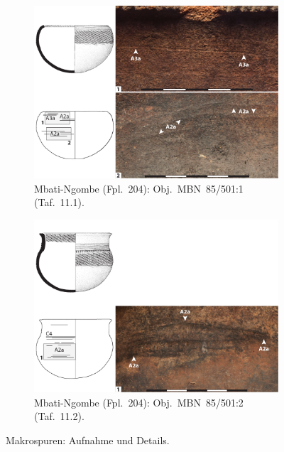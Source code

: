 \begin{multicols}{2}
\begin{figure}[p]
	\centering
	\begin{subfigure}{\textwidth}
		\centering
		\includegraphics[width = \textwidth]{fig/Abb_Macrotraces/MBN85-501-1.pdf}
		\caption{Mbati-Ngombe (Fpl.~204): Obj.~MBN~85/501:1 (Taf.~11.1).\vspace{1em}}
		\label{MBN85-501-1_Makrospuren}
	\end{subfigure}
	\begin{subfigure}{\textwidth}
		\centering
		\includegraphics[width = \textwidth]{fig/Abb_Macrotraces/MBN85-501-2.pdf}
		\caption{Mbati-Ngombe (Fpl.~204): Obj.~MBN~85/501:2 (Taf.~11.2).}
		\label{MBN85-501-2_Makrospuren}
	\end{subfigure}
	\caption{Makrospuren: Aufnahme und Details.}
\end{figure}


\end{multicols}
